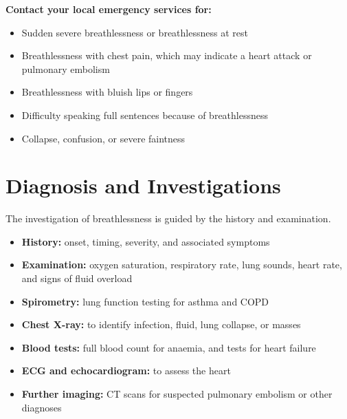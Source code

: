 \textbf{Contact your local emergency services for:}
\begin{itemize}
    \item Sudden severe breathlessness or breathlessness at rest
    \item Breathlessness with chest pain, which may indicate a heart attack or pulmonary embolism
    \item Breathlessness with bluish lips or fingers
    \item Difficulty speaking full sentences because of breathlessness
    \item Collapse, confusion, or severe faintness
\end{itemize}

\section*{Diagnosis and Investigations}
The investigation of breathlessness is guided by the history and examination.
\begin{itemize}
    \item \textbf{History:} onset, timing, severity, and associated symptoms
    \item \textbf{Examination:} oxygen saturation, respiratory rate, lung sounds, heart rate, and signs of fluid overload
    \item \textbf{Spirometry:} lung function testing for asthma and COPD
    \item \textbf{Chest X-ray:} to identify infection, fluid, lung collapse, or masses
    \item \textbf{Blood tests:} full blood count for anaemia, and tests for heart failure
    \item \textbf{ECG and echocardiogram:} to assess the heart
    \item \textbf{Further imaging:} CT scans for suspected pulmonary embolism or other diagnoses
\end{itemize}

